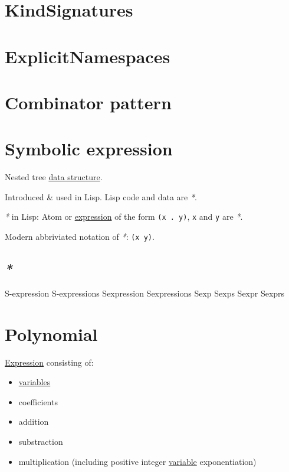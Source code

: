 \documentclass[a4paper,14pt,oneside]{book}
\begin{document}
\chapter{\label{org0d3736f}KindSignatures}
\label{sec:orgee55c45}

\chapter{\label{orgb95263c}ExplicitNamespaces}
\label{sec:orgdc2f2db}

\chapter{\label{orgd012348}Combinator pattern}
\label{sec:org330f4c9}

\chapter{\label{orgbbb7581}Symbolic expression}
\label{sec:orgeae986b}
Nested tree \hyperref[org6ffa079]{data structure}.

Introduced \& used in Lisp. Lisp code and data are \emph{*}.

\emph{*} in Lisp: Atom or \hyperref[org31f6486]{expression} of the form \texttt{(x . y)}, \texttt{x} and \texttt{y} are \emph{*}.

Modern abbriviated notation of \emph{*}: \texttt{(x y)}.

\section{\emph{*}}
\label{sec:orge4c2cab}

\label{org6f934ed}S-expression
\label{org05a76cd}S-expressions
\label{org48987ae}Sexpression
\label{org2db47fe}Sexpressions
\label{orgc8735ee}Sexp
\label{org5e17c32}Sexps
\label{orgb3c336f}Sexpr
\label{org4c6817c}Sexprs

\chapter{\label{orgc8efd31}Polynomial}
\label{sec:orgad08e3c}
\hyperref[org31f6486]{Expression} consisting of:
\begin{itemize}
\item \hyperref[orgda45931]{variables}
\item coefficients
\item addition
\item substraction
\item multiplication (including positive integer \hyperref[org9689db0]{variable} exponentiation)
\end{itemize}
\end{document}
